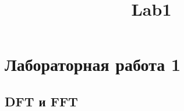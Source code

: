 \documentclass[11pt]{article}
\title{Lab1}
\begin{document}
    
    
    \maketitle
    
    

    
    \section{Лабораторная работа
1}\label{ux43bux430ux431ux43eux440ux430ux442ux43eux440ux43dux430ux44f-ux440ux430ux431ux43eux442ux430-1}

\subsection{DFT и FFT}\label{dft-ux438-fft}
\end{document}
